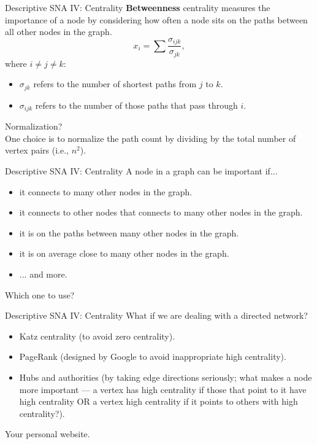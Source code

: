 \documentclass[10pt]{beamer}
\begin{document}
\begin{frame}{Descriptive SNA IV: Centrality}
\textbf{Betweenness} centrality measures the importance of a node by considering how often a node sits on the paths between all other nodes in the graph.
	\begin{equation}
	x_i = \sum \frac{\sigma_{ijk}}{\sigma_{jk}},
	\end{equation}
where $i\neq j\neq k$:
	\begin{itemize}
	\item $\sigma_{jk}$ refers to the number of shortest paths from $j$ to $k$.
	\item $\sigma_{ijk}$ refers to the number of those paths that pass through $i$.
	\end{itemize}

\vspace{0.3cm}
Normalization?\\

\vspace{0.3cm}
One choice is to normalize the path count by dividing by the total number of vertex pairs (i.e., $n^2$).
\end{frame}

\begin{frame}{Descriptive SNA IV: Centrality}
A node in a graph can be important if...

	\begin{itemize}
		\item it connects to many other nodes in the graph.	
		\item it connects to other nodes that connects to many other nodes in the graph.
		\item it is on the paths between many other nodes in the graph.
		\item it is on average close to many other nodes in the graph.
		\item ... and more.
	\end{itemize}

\vspace{0.3cm}
Which one to use?
\end{frame}

\begin{frame}{Descriptive SNA IV: Centrality}
What if we are dealing with a directed network?

	\begin{itemize}
		\item Katz centrality (to avoid zero centrality).
		\item PageRank (designed by Google to avoid inappropriate high centrality).
		\item Hubs and authorities (by taking edge directions seriously; what makes a node more important --- a vertex has high centrality if those that point to it have high centrality OR a vertex high centrality if it points to others with high centrality?).
	\end{itemize}

\vspace{0.3cm}
Your personal website.
\end{frame}
\end{document}
